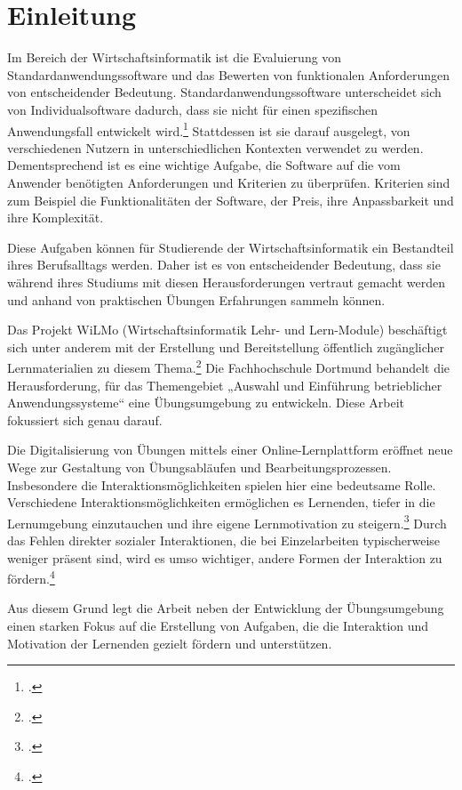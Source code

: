 \chapter{Einleitung}


Im Bereich der Wirtschaftsinformatik ist die Evaluierung von Standardanwendungssoftware und das Bewerten von funktionalen Anforderungen von entscheidender Bedeutung.
Standardanwendungssoftware unterscheidet sich von Individualsoftware dadurch, dass sie nicht für einen spezifischen Anwendungsfall entwickelt wird.\footcite[Vgl.][S. 3]{Teich2008}{}{} Stattdessen ist sie darauf ausgelegt, von verschiedenen Nutzern in unterschiedlichen Kontexten verwendet zu werden. 
Dementsprechend ist es eine wichtige Aufgabe, die Software auf die vom Anwender benötigten Anforderungen und Kriterien zu überprüfen. Kriterien sind zum Beispiel die Funktionalitäten der Software, der Preis, ihre Anpassbarkeit und ihre Komplexität.

Diese Aufgaben können für Studierende der Wirtschaftsinformatik ein Bestandteil ihres Berufsalltags  werden. Daher ist es von entscheidender Bedeutung, dass sie während ihres Studiums mit diesen Herausforderungen vertraut gemacht werden und anhand von praktischen Übungen Erfahrungen sammeln können.

Das Projekt WiLMo (Wirtschaftsinformatik Lehr- und Lern-Module) beschäftigt sich unter anderem mit der Erstellung und Bereitstellung öffentlich zugänglicher Lernmaterialien zu diesem Thema.\footcite[][]{wilmo}{}{} 
Die Fachhochschule Dortmund behandelt die Herausforderung, für das Themengebiet „Auswahl und Einführung betrieblicher Anwendungssysteme“ eine Übungsumgebung zu entwickeln. Diese Arbeit fokussiert sich genau darauf.  

Die Digitalisierung von Übungen mittels einer Online-Lernplattform eröffnet neue Wege zur Gestaltung von Übungsabläufen und Bearbeitungsprozessen. 
Insbesondere die Interaktionsmöglichkeiten spielen hier eine bedeutsame Rolle. 
Verschiedene Interaktionsmöglichkeiten ermöglichen es Lernenden, tiefer in die Lernumgebung einzutauchen und ihre eigene Lernmotivation zu steigern.\footcite[Vgl.][S.638]{BolognaDigital}{}{}
Durch das Fehlen direkter sozialer Interaktionen, die bei Einzelarbeiten typischerweise weniger präsent sind, wird es umso wichtiger, andere Formen der Interaktion zu fördern.\footcite[Vgl.][S.638]{BolognaDigital}{}{}

Aus diesem Grund legt die Arbeit neben der Entwicklung der Übungsumgebung einen starken Fokus auf die Erstellung von Aufgaben, die die Interaktion und Motivation der Lernenden gezielt fördern und unterstützen.

